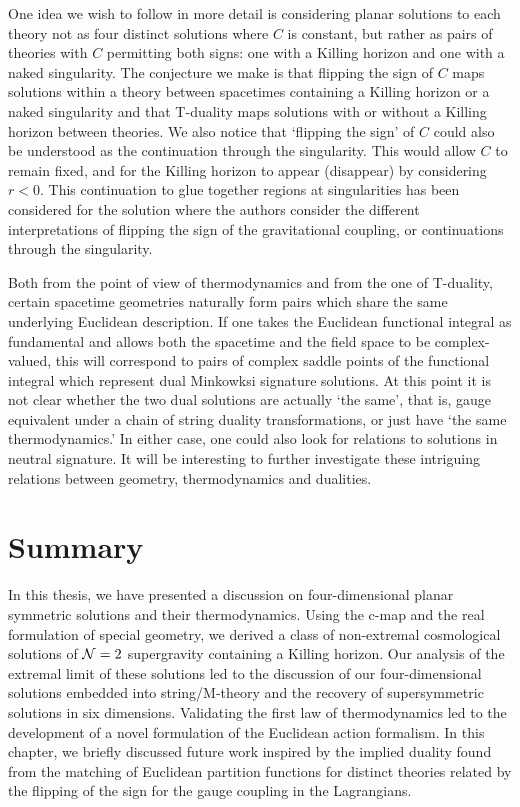 One idea we wish to follow in more detail is considering planar solutions to each theory not as four distinct solutions where $C$ is constant, but rather as pairs of theories with $C$ permitting both signs: one with a Killing horizon and one with a naked singularity. The conjecture we make is that flipping the sign of $C$ maps solutions within a theory between spacetimes containing a Killing horizon or a naked singularity and that T-duality maps solutions with or without a Killing horizon between theories. We also notice that `flipping the sign' of $C$ could also be understood as the continuation through the singularity. This would allow $C$ to remain fixed, and for the Killing horizon to appear (disappear) by considering $r < 0$. This continuation to glue together regions at singularities has been considered for the \sch solution \cite{Araya:2015fva} where the authors consider the different interpretations of flipping the sign of the gravitational coupling, or continuations through the singularity.

Both from the point of view of thermodynamics and from the one of T-duality, certain spacetime geometries naturally form pairs which share the same underlying Euclidean description. If one takes the Euclidean functional integral as fundamental and allows both the spacetime and the field space to be complex-valued, this will correspond to pairs of complex saddle points of the functional integral which represent dual Minkowksi signature solutions. At this point it is not clear whether the two dual solutions are actually `the same', that is, gauge equivalent under a chain of string duality transformations, or just have `the same thermodynamics.' In either case, one could also look for relations to solutions in neutral signature. It will be interesting to further investigate these intriguing relations between geometry, thermodynamics and dualities. 

\section{Summary}
\label{sec:summary}

In this thesis, we have presented a discussion on four-dimensional planar symmetric solutions and their thermodynamics. Using the c-map and the real formulation of special geometry, we derived a class of non-extremal cosmological solutions of ${\cal N} = 2$ supergravity containing a Killing horizon. Our analysis of the extremal limit of these solutions led to the discussion of our four-dimensional solutions embedded into string/M-theory and the recovery of supersymmetric solutions in six dimensions. Validating the first law of thermodynamics led to the development of a novel formulation of the Euclidean action formalism. In this chapter, we briefly discussed future work inspired by the implied duality found from the matching of Euclidean partition functions for distinct theories related by the flipping of the sign for the gauge coupling in the Lagrangians. 


